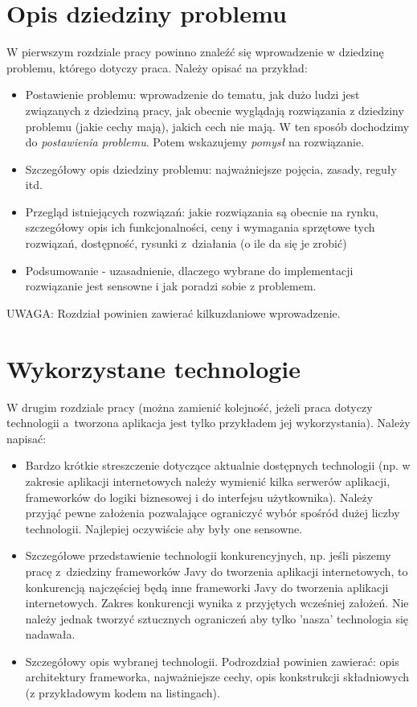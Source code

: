 \section{Opis dziedziny problemu}
W pierwszym rozdziale pracy powinno znaleźć się wprowadzenie w dziedzinę problemu, którego dotyczy praca. Należy opisać na przykład:
\begin{itemize}
\item Postawienie problemu: wprowadzenie do tematu, jak dużo ludzi jest związanych z dziedziną pracy, jak obecnie wyglądają rozwiązania z dziedziny problemu (jakie cechy mają), jakich cech nie mają. W ten sposób dochodzimy do \emph{postawienia problemu}. Potem wskazujemy \emph{pomysł} na rozwiązanie.
\item Szczegółowy opis dziedziny problemu: najważniejsze pojęcia, zasady, reguły itd.
\item Przegląd istniejących rozwiązań: jakie rozwiązania są obecnie na rynku, szczegółowy opis ich funkcjonalności, ceny i wymagania sprzętowe tych rozwiązań, dostępność, rysunki z~działania (o ile da się je zrobić)
\item Podsumowanie - uzasadnienie, dlaczego wybrane do implementacji rozwiązanie jest sensowne i jak poradzi sobie z problemem.
\end{itemize}

UWAGA: Rozdział powinien zawierać kilkuzdaniowe wprowadzenie.

\section{Wykorzystane technologie}
W drugim rozdziale pracy (można zamienić kolejność, jeżeli praca dotyczy technologii a~tworzona aplikacja jest tylko przykładem jej wykorzystania). Należy napisać:
\begin{itemize}
\item Bardzo krótkie streszczenie dotyczące aktualnie dostępnych technologii (np. w zakresie aplikacji internetowych należy wymienić kilka serwerów aplikacji, frameworków do logiki biznesowej i do interfejsu użytkownika). Należy przyjąć pewne założenia pozwalające ograniczyć wybór spośród dużej liczby technologii. Najlepiej oczywiście aby były one sensowne.
\item Szczegółowe przedstawienie technologii konkurencyjnych, np. jeśli piszemy pracę z~dziedziny frameworków Javy do tworzenia aplikacji internetowych, to konkurencją najczęściej będą inne frameworki Javy do tworzenia aplikacji internetowych. Zakres konkurencji wynika z przyjętych wcześniej założeń. Nie należy jednak tworzyć sztucznych ograniczeń aby tylko 'nasza' technologia się nadawała.
\item Szczegółowy opis wybranej technologii. Podrozdział powinien zawierać: opis architektury frameworka, najważniejsze cechy, opis konkstrukcji składniowych (z przykładowym kodem na listingach).
\end{itemize}

